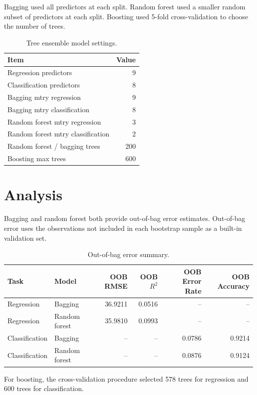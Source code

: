 \documentclass[11pt,oneside,openany]{book}
\begin{document}
Bagging used all predictors at each split. Random forest used a smaller random subset of predictors at each split. Boosting used 5-fold cross-validation to choose the number of trees.

\begin{table}[H]
\centering
\small
\caption{Tree ensemble model settings.}
\begin{tabular}{lr}
\toprule
Item & Value\\
\midrule
Regression predictors & 9\\
Classification predictors & 8\\
Bagging mtry regression & 9\\
Bagging mtry classification & 8\\
Random forest mtry regression & 3\\
Random forest mtry classification & 2\\
Random forest / bagging trees & 200\\
Boosting max trees & 600\\
\bottomrule
\end{tabular}
\end{table}

\section{Analysis}

Bagging and random forest both provide out-of-bag error estimates. Out-of-bag error uses the observations not included in each bootstrap sample as a built-in validation set.

\begin{table}[H]
\centering
\small
\caption{Out-of-bag error summary.}
\begin{tabular}{llrrrr}
\toprule
Task & Model & OOB RMSE & OOB \(R^2\) & OOB Error Rate & OOB Accuracy\\
\midrule
Regression & Bagging & 36.9211 & 0.0516 & -- & --\\
Regression & Random forest & 35.9810 & 0.0993 & -- & --\\
Classification & Bagging & -- & -- & 0.0786 & 0.9214\\
Classification & Random forest & -- & -- & 0.0876 & 0.9124\\
\bottomrule
\end{tabular}
\end{table}

For boosting, the cross-validation procedure selected 578 trees for regression and 600 trees for classification.
\end{document}
